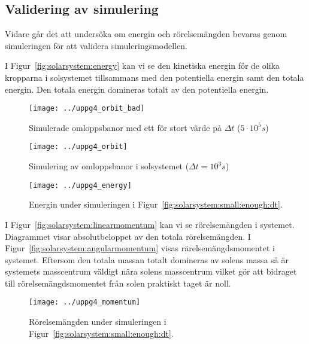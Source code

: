 \documentclass[a4]{article}
\begin{document}

		\subsection{Validering av simulering}
Vidare går det att undersöka om energin och rörelsemängden
bevaras genom simuleringen för att validera
simuleringsmodellen.

I Figur~\vref{fig:solarsystem:energy} kan vi se den kinetiska energin för de olika kropparna i solsystemet
tillsammans med den potentiella energin samt den totala energin.
Den totala energin domineras totalt av den potentiella energin.

\begin{figure}
\begin{center}
	\texttt{[image: ../uppg4\_orbit\_bad]}
\end{center}
\caption{Simulerade omloppsbanor med ett för stort värde på $\Delta t$ ($5\cdot 10^5 s$)}
\label{fig:solarsystem:large:dt}
\end{figure}

\begin{figure}
\begin{center}
	\texttt{[image: ../uppg4\_orbit]}
\end{center}
\caption{Simulering av omloppsbanor i solsystemet ($\Delta t = 10^3 s$)}
\label{fig:solarsystem:small:enough:dt}
\end{figure}

\begin{figure}
\begin{center}
	\texttt{[image: ../uppg4\_energy]}
\end{center}
\caption{Energin under simuleringen i Figur~\vref{fig:solarsystem:small:enough:dt}.}
\label{fig:solarsystem:energy}
\end{figure}

I Figur~\vref{fig:solarsystem:linearmomentum} kan vi se rörelsemängden i systemet.
Diagrammet visar absolutbeloppet av den totala rörelsemängden.
I Figur~\vref{fig:solarsystem:angularmomentum} visas rärelsemängdsmomentet i systemet.
Eftersom den totala massan totalt domineras av solens massa så är systemets
masscentrum väldigt nära solens masscentrum vilket gör att bidraget till
rörelsemängdsmomentet från solen praktiskt taget är noll.
\begin{figure}
\begin{center}
	\texttt{[image: ../uppg4\_momentum]}
\end{center}
\caption{Rörelsemängden under simuleringen i Figur~\vref{fig:solarsystem:small:enough:dt}.}
\label{fig:solarsystem:linearmomentum}
\end{figure}
\end{document}
